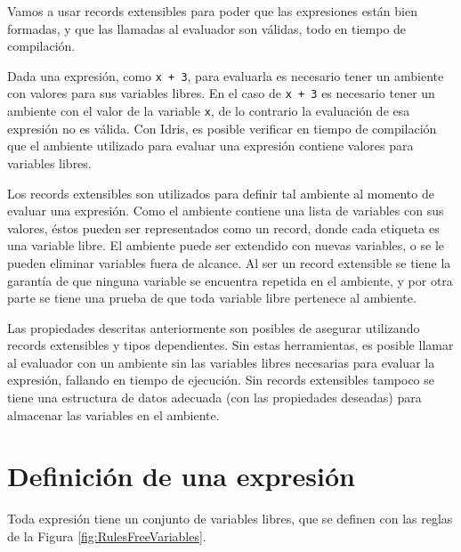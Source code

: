 Vamos a usar records extensibles para poder que las expresiones están bien formadas, y que las llamadas al evaluador son válidas, todo en tiempo de compilación.

Dada una expresión, como \texttt{x + 3}, para evaluarla es necesario tener un ambiente con valores para sus variables libres. En el caso de \texttt{x + 3} es necesario tener un ambiente con el valor de la variable \texttt{x}, de lo contrario la evaluación de esa expresión no es válida. Con Idris, es posible verificar en tiempo de compilación que el ambiente utilizado para evaluar una expresión contiene valores para variables libres.

Los records extensibles son utilizados para definir tal ambiente al momento de evaluar una expresión. Como el ambiente contiene una lista de variables con sus valores, éstos pueden ser representados como un record, donde cada etiqueta es una variable libre. El ambiente puede ser extendido con nuevas variables, o se le pueden eliminar variables fuera de alcance. Al ser un record extensible se tiene la garantía de que ninguna variable se encuentra repetida en el ambiente, y por otra parte se tiene una prueba de que toda variable libre pertenece al ambiente.

Las propiedades descritas anteriormente son posibles de asegurar utilizando records extensibles y tipos dependientes. Sin estas herramientas, es posible llamar al evaluador con un ambiente sin las variables libres necesarias para evaluar la expresión, fallando en tiempo de ejecución. Sin records extensibles tampoco se tiene una estructura de datos adecuada (con las propiedades deseadas) para almacenar las variables en el ambiente.

\section{Definición de una expresión}

Toda expresión tiene un conjunto de variables libres, que se definen con las reglas de la Figura \ref{fig:RulesFreeVariables}.

